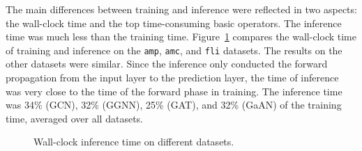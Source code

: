 The main differences between training and inference were reflected in two aspects: the wall-clock time and the top time-consuming basic operators.
%
The inference time was much less than the training time.
%
Figure~\ref{fig:compare_wall_clock_time_of_training_and_inference} compares the wall-clock time of training and inference on the \texttt{amp}, \texttt{amc}, and \texttt{fli} datasets.
%
The results on the other datasets were similar.
%
Since the inference only conducted the forward propagation from the input layer to the prediction layer, the time of inference was very close to the time of the forward phase in training.
%
The inference time was 34\% (GCN), 32\% (GGNN), 25\% (GAT), and 32\% (GaAN) of the training time, averaged over all datasets.

\begin{figure}[H]
    \centering
    \caption{Wall-clock inference time on different datasets.}
    \label{fig:compare_wall_clock_time_of_training_and_inference}
\end{figure}

